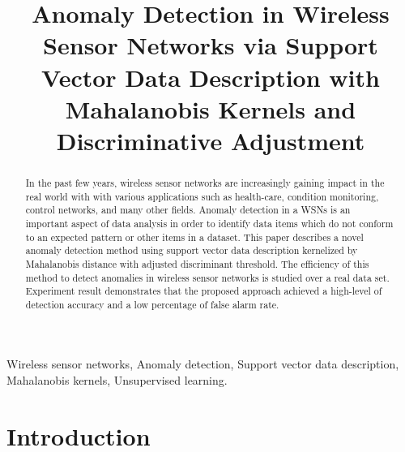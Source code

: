 \documentclass[conference]{IEEEtran}
\theoremstyle{problemstyle}
\begin{document}
\title{Anomaly Detection in Wireless Sensor Networks via Support Vector Data Description with Mahalanobis Kernels and Discriminative Adjustment}

\author{
\and
{}
}

\maketitle

\begin{abstract}

In the past few years, wireless sensor networks are increasingly gaining impact in the real world with with various applications such as health-care, condition monitoring, control networks, and many other fields. Anomaly detection in a WSNs is an important aspect of data analysis in order to identify data items which do not conform to an expected pattern or other items in a dataset. This paper describes a novel anomaly detection method using support vector data description kernelized by Mahalanobis distance with adjusted discriminant threshold. The efficiency of this method to detect anomalies in wireless sensor networks is studied over a real data set. Experiment result demonstrates that the proposed approach  achieved a high-level of detection accuracy and a low percentage of false alarm rate.
\end{abstract}

\begin{IEEEkeywords}
Wireless sensor networks, Anomaly detection, Support vector data description, Mahalanobis kernels, Unsupervised learning.
\end{IEEEkeywords}

\IEEEpeerreviewmaketitle

\section{Introduction}
\end{document}
